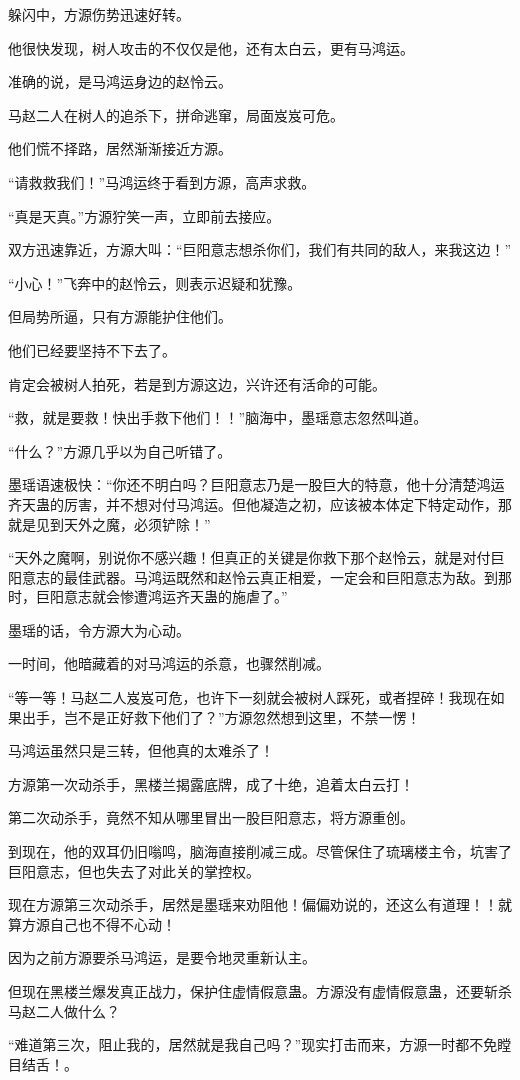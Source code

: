 \begin{this_body}
躲闪中，方源伤势迅速好转。

他很快发现，树人攻击的不仅仅是他，还有太白云，更有马鸿运。

准确的说，是马鸿运身边的赵怜云。

马赵二人在树人的追杀下，拼命逃窜，局面岌岌可危。

他们慌不择路，居然渐渐接近方源。

“请救救我们！”马鸿运终于看到方源，高声求救。

“真是天真。”方源狞笑一声，立即前去接应。

双方迅速靠近，方源大叫：“巨阳意志想杀你们，我们有共同的敌人，来我这边！”

“小心！”飞奔中的赵怜云，则表示迟疑和犹豫。

但局势所逼，只有方源能护住他们。

他们已经要坚持不下去了。

肯定会被树人拍死，若是到方源这边，兴许还有活命的可能。

“救，就是要救！快出手救下他们！！”脑海中，墨瑶意志忽然叫道。

“什么？”方源几乎以为自己听错了。

墨瑶语速极快：“你还不明白吗？巨阳意志乃是一股巨大的特意，他十分清楚鸿运齐天蛊的厉害，并不想对付马鸿运。但他凝造之初，应该被本体定下特定动作，那就是见到天外之魔，必须铲除！”

“天外之魔啊，别说你不感兴趣！但真正的关键是你救下那个赵怜云，就是对付巨阳意志的最佳武器。马鸿运既然和赵怜云真正相爱，一定会和巨阳意志为敌。到那时，巨阳意志就会惨遭鸿运齐天蛊的施虐了。”

墨瑶的话，令方源大为心动。

一时间，他暗藏着的对马鸿运的杀意，也骤然削减。

“等一等！马赵二人岌岌可危，也许下一刻就会被树人踩死，或者捏碎！我现在如果出手，岂不是正好救下他们了？”方源忽然想到这里，不禁一愣！

马鸿运虽然只是三转，但他真的太难杀了！

方源第一次动杀手，黑楼兰揭露底牌，成了十绝，追着太白云打！

第二次动杀手，竟然不知从哪里冒出一股巨阳意志，将方源重创。

到现在，他的双耳仍旧嗡鸣，脑海直接削减三成。尽管保住了琉璃楼主令，坑害了巨阳意志，但也失去了对此关的掌控权。

现在方源第三次动杀手，居然是墨瑶来劝阻他！偏偏劝说的，还这么有道理！！就算方源自己也不得不心动！

因为之前方源要杀马鸿运，是要令地灵重新认主。

但现在黑楼兰爆发真正战力，保护住虚情假意蛊。方源没有虚情假意蛊，还要斩杀马赵二人做什么？

“难道第三次，阻止我的，居然就是我自己吗？”现实打击而来，方源一时都不免瞠目结舌！。

\end{this_body}


